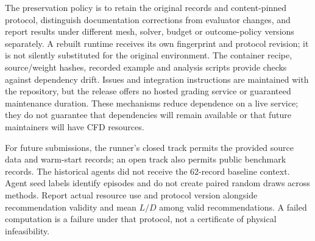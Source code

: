 The preservation policy is to retain the original records and content-pinned
protocol, distinguish documentation corrections from evaluator changes, and
report results under different mesh, solver, budget or outcome-policy versions
separately. A rebuilt runtime receives its own fingerprint and protocol
revision; it is not silently substituted for the original environment.
The container recipe, source/weight hashes, recorded example and analysis
scripts provide checks against dependency drift. Issues and integration
instructions are maintained with the repository, but the release offers no
hosted grading service or guaranteed maintenance duration. These mechanisms
reduce dependence on a live service; they do not guarantee that dependencies
will remain available or that future maintainers will have CFD resources.

For future submissions, the runner's closed track permits the provided
source data and warm-start records; an open track also permits public
benchmark records. The historical agents did not receive the 62-record
baseline context. Agent seed labels identify episodes and do not create
paired random draws across methods. Report actual resource use and protocol
version alongside recommendation validity and mean $L/D$ among valid
recommendations. A failed computation is a failure under that protocol,
not a certificate of physical infeasibility.
